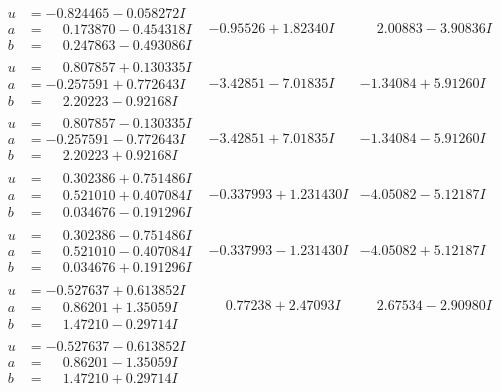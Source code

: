 \documentclass[1p]{elsarticle_modified}
\theoremstyle{definition}
\begin{document}
$$\begin{array}{c|c|c}
\begin{aligned}
u &= -0.824465 - 0.058272 I \\
a &= \phantom{-}0.173870 - 0.454318 I \\
b &= \phantom{-}0.247863 - 0.493086 I\end{aligned}
 & -0.95526 + 1.82340 I & \phantom{-}2.00883 - 3.90836 I \\ \hline\begin{aligned}
u &= \phantom{-}0.807857 + 0.130335 I \\
a &= -0.257591 + 0.772643 I \\
b &= \phantom{-}2.20223 - 0.92168 I\end{aligned}
 & -3.42851 - 7.01835 I & -1.34084 + 5.91260 I \\ \hline\begin{aligned}
u &= \phantom{-}0.807857 - 0.130335 I \\
a &= -0.257591 - 0.772643 I \\
b &= \phantom{-}2.20223 + 0.92168 I\end{aligned}
 & -3.42851 + 7.01835 I & -1.34084 - 5.91260 I \\ \hline\begin{aligned}
u &= \phantom{-}0.302386 + 0.751486 I \\
a &= \phantom{-}0.521010 + 0.407084 I \\
b &= \phantom{-}0.034676 - 0.191296 I\end{aligned}
 & -0.337993 + 1.231430 I & -4.05082 - 5.12187 I \\ \hline\begin{aligned}
u &= \phantom{-}0.302386 - 0.751486 I \\
a &= \phantom{-}0.521010 - 0.407084 I \\
b &= \phantom{-}0.034676 + 0.191296 I\end{aligned}
 & -0.337993 - 1.231430 I & -4.05082 + 5.12187 I \\ \hline\begin{aligned}
u &= -0.527637 + 0.613852 I \\
a &= \phantom{-}0.86201 + 1.35059 I \\
b &= \phantom{-}1.47210 - 0.29714 I\end{aligned}
 & \phantom{-}0.77238 + 2.47093 I & \phantom{-}2.67534 - 2.90980 I \\ \hline\begin{aligned}
u &= -0.527637 - 0.613852 I \\
a &= \phantom{-}0.86201 - 1.35059 I \\
b &= \phantom{-}1.47210 + 0.29714 I\end{aligned}

\end{array}$$
\end{document}

